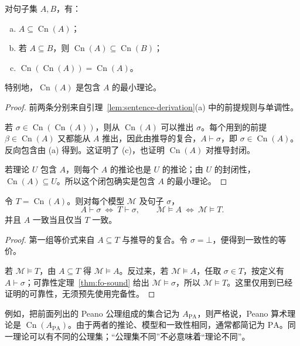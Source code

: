 \documentclass[lang=cn,a4paper,fontset=none,zihao=false,10pt,openany,twoside]{beautybook}
\numberwithin{algorithm}{chapter}
\begin{document}
\begin{proposition}[推导闭包的性质]\label{prop:deductive-closure}
对句子集 $A,B$，有：
\begin{enumerate}[(a)]
\item $A\subseteq\operatorname{Cn}(A)$；
\item 若 $A\subseteq B$，则 $\operatorname{Cn}(A)\subseteq\operatorname{Cn}(B)$；
\item $\operatorname{Cn}(\operatorname{Cn}(A))=\operatorname{Cn}(A)$。
\end{enumerate}
特别地，$\operatorname{Cn}(A)$ 是包含 $A$ 的最小理论。
\end{proposition}
\begin{proof}
前两条分别来自引理~\ref{lem:sentence-derivation}(a) 中的前提规则与单调性。

若 $\sigma\in\operatorname{Cn}(\operatorname{Cn}(A))$，则从 $\operatorname{Cn}(A)$ 可以推出 $\sigma$。每个用到的前提 $\beta\in\operatorname{Cn}(A)$ 又都能从 $A$ 推出，因此由推导的复合，$A\vdash\sigma$，即 $\sigma\in\operatorname{Cn}(A)$。反向包含由 (a) 得到。这证明了 (c)，也证明 $\operatorname{Cn}(A)$ 对推导封闭。

若理论 $U$ 包含 $A$，则每个 $A$ 的推论也是 $U$ 的推论；由 $U$ 的封闭性，$\operatorname{Cn}(A)\subseteq U$。所以这个闭包确实是包含 $A$ 的最小理论。
\end{proof}

\begin{proposition}[公理集与理论的模型及一致性]\label{prop:axioms-theory}
令 $T=\operatorname{Cn}(A)$。则对每个模型 $\mathcal M$ 及句子 $\sigma$，
\[
 A\vdash\sigma\ \Longleftrightarrow\ T\vdash\sigma,
 \qquad
 \mathcal M\models A\ \Longleftrightarrow\ \mathcal M\models T.
\]
并且 $A$ 一致当且仅当 $T$ 一致。
\end{proposition}
\begin{proof}
第一组等价式来自 $A\subseteq T$ 与推导的复合。令 $\sigma=\bot$，便得到一致性的等价。

若 $\mathcal M\models T$，由 $A\subseteq T$ 得 $\mathcal M\models A$。反过来，若 $\mathcal M\models A$，任取 $\sigma\in T$，按定义有 $A\vdash\sigma$；可靠性定理~\ref{thm:fo-sound} 给出 $\mathcal M\models\sigma$，所以 $\mathcal M\models T$。这里仅用到已经证明的可靠性，无须预先使用完备性。
\end{proof}
例如，把前面列出的 Peano 公理组成的集合记为 $A_{\mathrm{PA}}$，则严格说，Peano 算术理论是 $\operatorname{Cn}(A_{\mathrm{PA}})$。由于两者的推论、模型和一致性相同，通常都简记为 $\mathrm{PA}$。同一理论可以有不同的公理集；“公理集不同”不必意味着“理论不同”。
\end{document}
